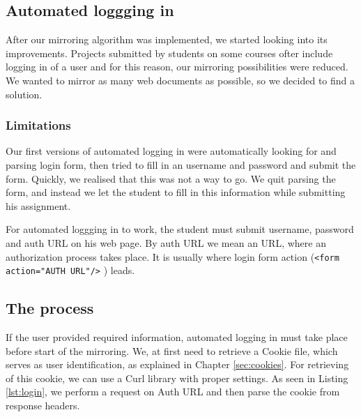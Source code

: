 
\subsection{Automated loggging in}
\label{sec:login}
After our mirroring algorithm was implemented, we started looking into its improvements. Projects submitted by students on some courses ofter include logging in of a user and for this reason, our mirroring possibilities were reduced. We wanted to mirror as many web documents as possible, so we decided to find a solution.

\subsubsection{Limitations}
Our first versions of automated logging in were automatically looking for and parsing login form, then tried to fill in an username and password and submit the form. Quickly, we realised that this was not a way to go. We quit parsing the form, and instead we let the student to fill in this information while submitting his assignment.

For automated loggging in to work, the student must submit username, password and auth URL on his web page. By auth URL we mean an URL, where an authorization process takes place. It is usually where login form action (\texttt{<form action="AUTH URL"/>} ) leads.

\subsection{The process}
If the user provided required information, automated logging in must take place before start of the mirroring. We, at first need to retrieve a Cookie file, which serves as user identification, as explained in Chapter \ref{sec:cookies}. For retrieving of this cookie, we can use a Curl library with proper settings. As seen in Listing \ref{lst:login}, we perform a request on Auth URL and then parse the cookie from response headers.

